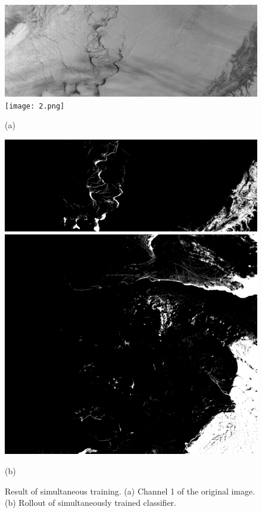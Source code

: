 \documentclass{article}
\begin{document}
        \begin{figure}[ht]
            \centering
            \begin{minipage}{0.49\hsize}
                \centering
                \includegraphics[width = 1\hsize]{1.png}
                \texttt{[image: 2.png]}
                \caption*{(a)}
            \end{minipage}
            \begin{minipage}{0.49\hsize}
                \centering
                \includegraphics[width = 1\hsize]{1_supervised.png}
                \includegraphics[width = 1\hsize]{2_supervised.png}
                \caption*{(b)}
            \end{minipage}
            \caption{
                Result of simultaneous training.
                (a) Channel 1 of the original image.
                (b) Rollout of simultaneously trained classifier.
            }
            \label{fig:supervised}
        \end{figure}
\end{document}
